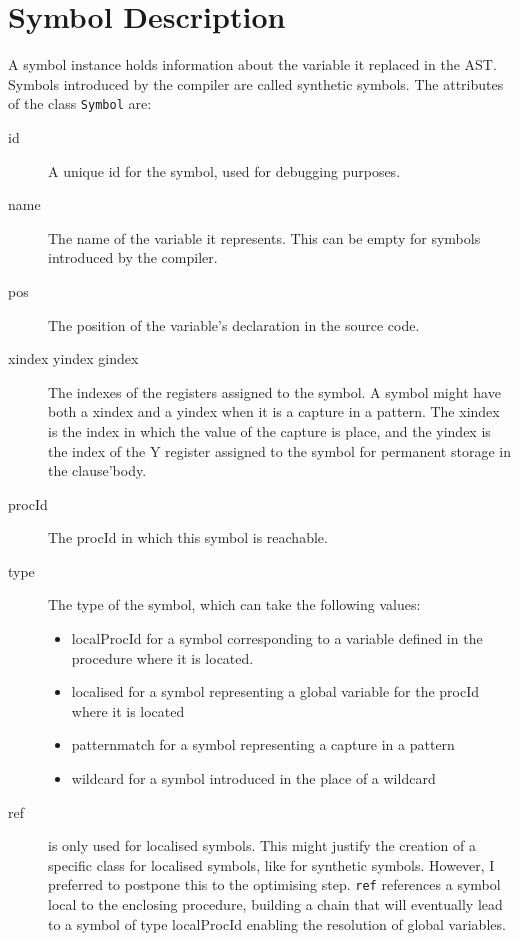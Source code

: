 \documentclass[a4paper]{memoir}
\begin{document}
\begin{appendices}
\begin{tabular} {p{4cm}p{4cm}p{5cm}}
\end{tabular}

\chapter{Symbol Description}\label{appendix:symbol}
A symbol instance holds information about the variable it replaced in the AST. Symbols introduced by the compiler are called synthetic symbols.
The attributes of the class \lstinline!Symbol! are:
\begin{description}
  \item[id] A unique id for the symbol, used for debugging purposes.
  \item[name] The name of the variable it represents. This can be empty for symbols introduced by the compiler.
  \item[pos] The position of the variable's declaration in the source code.
  \item[xindex yindex gindex] The indexes of the registers assigned to the symbol. A symbol might have both a xindex and a yindex when it is a capture in a pattern. The xindex is the index in which the value of the capture is place, and the yindex is the index of the Y register assigned to the symbol for permanent storage in the clause'body.
  \item[procId] The procId in which this symbol is reachable.
  \item[type] The type of the symbol, which can take the following values:
    \begin{itemize}
      \item localProcId for a symbol corresponding to a variable defined in the procedure where it is located.
      \item localised for a symbol representing a global variable for the procId where it is located
      \item patternmatch for a symbol representing a capture in a pattern
      \item wildcard for a symbol introduced in the place of a wildcard
    \end{itemize}
  \item[ref] is only used for localised symbols. This might justify the creation
    of a specific class for localised symbols, like for synthetic symbols.
    However, I preferred to postpone this to the optimising step. \lstinline!ref! references a symbol local to the enclosing procedure, building a chain that will eventually lead to a symbol of type localProcId enabling the resolution of global variables. %
\end{description}


\end{appendices}
\end{document}
